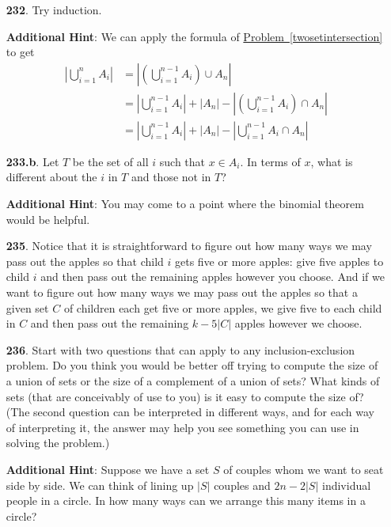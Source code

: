 \documentclass[10pt,]{book}
\theoremstyle{plain}
\theoremstyle{definition}
\theoremstyle{definition}
\numberwithin{equation}{chapter}
\newcommand{\amp}{&}
\begin{document}
\begin{itemize}[itemsep=1em]
\item[\textbf{232}.]Try induction.%

\par\smallskip
\noindent\textbf{Additional Hint}: We can apply the formula of \hyperref[twosetintersection]{Problem~\ref{twosetintersection}} to get%
\begin{align*}
\left|\bigcup_{i=1}^n A_i \right| \amp = \left|\left(\bigcup_{i=1}^{n-1} A_i\right) \cup A_n \right| \\
\amp = \left| \bigcup_{i=1}^{n-1} A_i\right| + |A_n| - \left|\left( \bigcup_{i=1}^{n-1} A_i\right) \cap A_n\right|\\
\amp = \left| \bigcup_{i=1}^{n-1} A_i\right| + |A_n| - \left|\bigcup_{i=1}^{n-1} A_i \cap A_n\right|
\end{align*}
%

\item[\textbf{233.b}.]Let \(T\) be the set of all \(i\) such that \(x \in A_i\). In terms of \(x\), what is different about the \(i\) in \(T\) and those not in \(T\)?%

\par\smallskip
\noindent\textbf{Additional Hint}: You may come to a point where the binomial theorem would be helpful.%

\item[\textbf{235}.]Notice that it is straightforward to figure out how many ways we may pass out the apples so that child \(i\) gets five or more apples: give five apples to child \(i\) and then pass out the remaining apples however you choose. And if  we want to figure out how many ways we may pass out the apples so that a given set \(C\) of children each get five or more apples, we give five to each child in \(C\) and then pass out the remaining \(k-5|C|\) apples however we choose.%

\item[\textbf{236}.]Start with two questions that can apply to any inclusion-exclusion problem. Do you think you would be better off trying to compute the size of a union of sets or the size of a complement of a union of sets? What kinds of sets (that are conceivably of use to you) is it easy to compute the size of? (The second question can be interpreted in different ways, and for each way of interpreting it, the answer may help you see something you can use in solving the problem.)%

\par\smallskip
\noindent\textbf{Additional Hint}: Suppose we have a set \(S\) of couples whom we want to seat side by side. We can think of lining up \(|S|\) couples and \(2n - 2|S|\) individual people in a circle.  In how many ways can we arrange this many items in a circle?%


\end{itemize}
\end{document}
